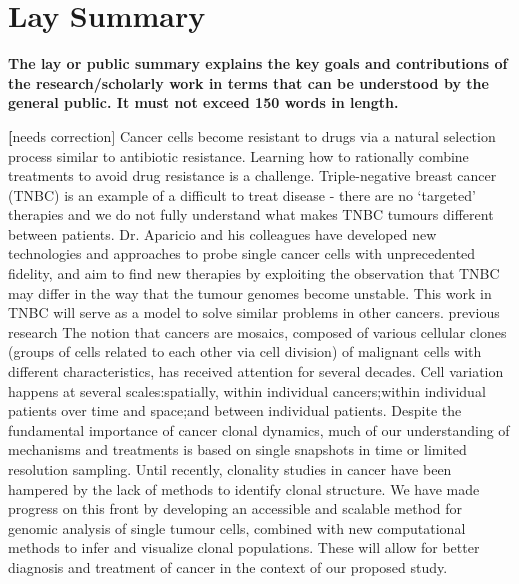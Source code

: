 

 \chapter{Lay Summary}

\textbf{The lay or public summary explains the key goals and contributions of
the research\slash{}scholarly work in terms that can be understood by the
general public. It must not exceed 150 words in length.}

\textbf[{needs correction}] Cancer cells become resistant to drugs via a natural selection process similar to antibiotic resistance. Learning
how to rationally combine treatments to avoid drug resistance is a challenge. Triple-negative breast cancer
(TNBC) is an example of a difficult to treat disease - there are no ‘targeted’ therapies and we do not fully
understand what makes TNBC tumours different between patients. Dr. Aparicio and his colleagues have
developed new technologies and approaches to probe single cancer cells with unprecedented fidelity, and aim to
find new therapies by exploiting the observation that TNBC may differ in the way that the tumour genomes
become unstable. This work in TNBC will serve as a model to solve similar problems in other cancers.
previous research
The notion that cancers are mosaics, composed of various cellular clones (groups of cells related to each other
via cell division) of malignant cells with different characteristics, has received attention for several decades. Cell
variation happens at several scales:spatially, within individual cancers;within individual patients over time and
space;and between individual patients. Despite the fundamental importance of cancer clonal dynamics, much of
our understanding of mechanisms and treatments is based on single snapshots in time or limited resolution
sampling. Until recently, clonality studies in cancer have been hampered by the lack of methods to identify clonal
structure. We have made progress on this front by developing an accessible and scalable method for genomic
analysis of single tumour cells, combined with new computational methods to infer and visualize clonal
populations. These will allow for better diagnosis and treatment of cancer in the context of our proposed study.

